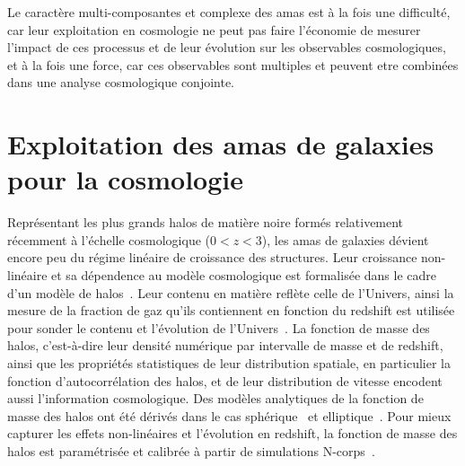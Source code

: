 Le caractère multi-composantes et complexe des amas est à la fois une
difficulté, car leur exploitation en cosmologie ne peut pas faire
l'économie de mesurer l'impact de ces processus et de leur évolution
sur les observables cosmologiques, et à la fois une force, car ces
observables sont multiples et peuvent etre combinées dans une analyse
cosmologique conjointe.

\section{Exploitation des amas de galaxies pour la cosmologie}
\label{se:sondecosmo}

Représentant les plus grands halos de matière noire formés
relativement récemment à l'échelle cosmologique ($0<z<3$), les amas de
galaxies dévient encore peu du régime linéaire de croissance des structures.
Leur croissance non-linéaire et sa dépendence au modèle cosmologique
est formalisée dans le cadre d'un modèle de halos~\citep[pour une
revue voir][par exemple]{Cooray2002}. Leur contenu en matière reflète
celle de l'Univers, ainsi la mesure de la fraction de gaz qu'ils
contiennent en fonction du redshift est utilisée pour sonder le
contenu et l'évolution de
l'Univers~\citep[\emph{e.g.}][]{Allen2008,Ettori2009}. La
fonction de masse des halos, c'est-à-dire leur densité numérique par
intervalle de masse et de redshift, ainsi que les propriétés statistiques de leur
distribution spatiale, en particulier la fonction d'autocorrélation
des halos, et de leur distribution de vitesse encodent aussi
l'information cosmologique. Des modèles analytiques de la fonction de
masse des halos ont été dérivés dans le cas sphérique~\citep{Press-Schechter1974}
et elliptique~\citep{Sheth2001}. Pour mieux capturer les effets
non-linéaires et l'évolution en redshift, la fonction de masse des
halos est paramétrisée et calibrée à partir de simulations
N-corps~\citep[][par exemple]{Eke1996, Tinker2008}.

